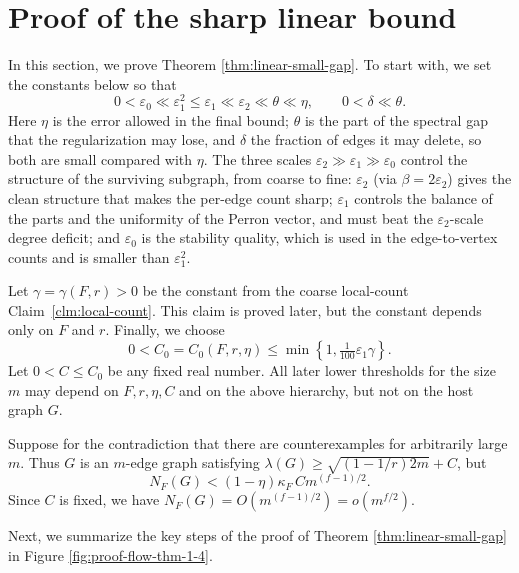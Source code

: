 \documentclass[11pt,a4paper]{article}
\theoremstyle{definition}
\theoremstyle{plain}
\newcommand{\eps}{\varepsilon}
\newcommand{\Ksharp}{\kappa_{F}}
\renewcommand{\le}{\leqslant}
\renewcommand{\ge}{\geqslant}
\begin{document}
\section{Proof of the sharp linear bound}

\label{sec:main} 


In this section, we prove Theorem \ref{thm:linear-small-gap}. To start with, we set  
the constants below so that
\[
  0<\eps_0\ll\eps_1^2\le\eps_1\ll\eps_2\ll\theta\ll\eta,
  \qquad
  0<\delta\ll\theta.
\]
Here $\eta$ is the error allowed in the final bound; $\theta$ is the part of the spectral
gap that the regularization may lose, and $\delta$ the fraction of edges it may delete, so
both are small compared with $\eta$. The three scales $\eps_2\gg\eps_1\gg\eps_0$ control the
structure of the surviving subgraph, from coarse to fine: $\eps_2$ (via $\beta=2\eps_2$) gives
the clean structure that makes the per-edge count sharp; $\eps_1$ controls the balance of the
parts and the uniformity of the Perron vector, and must beat the $\eps_2$-scale degree
deficit; and $\eps_0$ is the stability quality, which is
used in the edge-to-vertex counts and is smaller than $\eps_1^2$. 

Let $\gamma=\gamma(F,r)>0$ be the constant from the coarse local-count Claim~\ref{clm:local-count}.  This claim is proved later, but the constant depends only on $F$ and $r$.  Finally, we choose
\[
  0<C_0=C_0(F,r,\eta)\le \min\left\{1,\tfrac{1}{100}\eps_1\gamma\right\}.
\]
Let $0<C\le C_0$ be any fixed real number.  All later lower thresholds for the size $m$ may depend on $F,r,\eta,C$ and on the above hierarchy, but not on the host graph $G$.

Suppose for the contradiction that there are counterexamples for arbitrarily large $m$.  Thus $G$ is an $m$-edge graph satisfying
$ \lambda(G)\ge \sqrt{(1\!-\! {1}/{r})2m} +C$, 
but
\begin{equation}\label{eq:sharp-counter}
  N_F(G)<
  (1-\eta)\Ksharp\,C m^{(f-1)/2}.
\end{equation}
Since $C$ is fixed, we have $  N_F(G)=O (m^{(f-1)/2})=o(m^{f/2}).$ 

Next, we summarize the key steps of the proof of 
Theorem \ref{thm:linear-small-gap} in Figure \ref{fig:proof-flow-thm-1-4}. 
\end{document}
